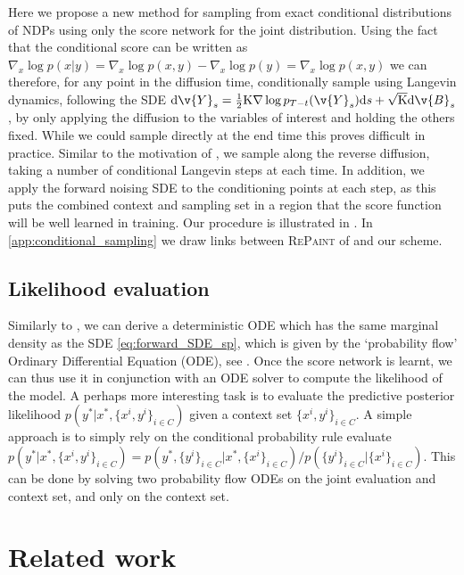 Here we propose a new method for sampling from exact conditional distributions of NDPs using only the score network for the joint distribution.
Using the fact that the conditional score can be written as \(\nabla_x \log p(x|y) = \nabla_x \log p(x, y) - \nabla_x \log p(y) = \nabla_x \log p(x, y)\) we can therefore, for any point in the diffusion time, conditionally sample using Langevin dynamics, following the SDE \(\mathrm{d} \v{Y}_s = \tfrac{1}{2} \mathrm{K} \nabla \log p_{T-t}(\v{Y}_s) \mathrm{d} s + \sqrt{\mathrm{K}} \mathrm{d} \v{B}_s\), by only applying the diffusion to the variables of interest and holding the others fixed.
While we could sample directly at the end time this proves difficult in practice.
Similar to the motivation of \textcite{song2019generative}, we sample along the reverse diffusion, taking a number of conditional Langevin steps at each time.
In addition, we apply the forward noising SDE to the conditioning points at each step, as this puts the combined context and sampling set in a region that the score function will be well learned in training.
Our procedure is illustrated in .
In \cref{app:conditional_sampling} we draw links between \textsc{RePaint} of \textcite{lugmayr2022repaint} and our scheme.

\subsection{Likelihood evaluation}

Similarly to \textcite{song2020score}, we can derive a deterministic ODE which has the same marginal density as the SDE \eqref{eq:forward_SDE_sp}, which is given by the `probability flow' Ordinary Differential Equation (ODE), see .
Once the score network is learnt, we can thus use it in conjunction with an ODE solver to compute the likelihood of the model.
A perhaps more interesting task is to evaluate the predictive posterior likelihood \(p(y^*|x^*,\{x^i,y^i\}_{i \in C})\) given a context set \(\{x^i,y^i\}_{i \in C}\).
A simple approach is to simply rely on the conditional probability rule evaluate \(p(y^*|x^*,\{x^i,y^i\}_{i \in C}) = p(y^*,\{y^i\}_{i \in C}|x^*,\{x^i\}_{i \in C}) / p(\{y^i\}_{i \in C}|\{x^i\}_{i \in C})\).
This can be done by solving two probability flow ODEs on the joint evaluation and context set, and only on the context set.

\section{Related work}

